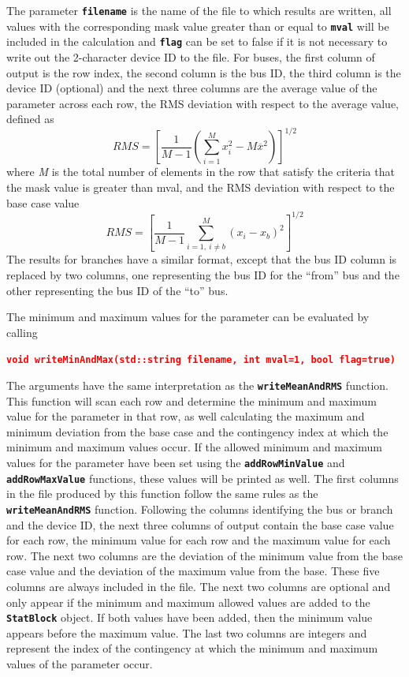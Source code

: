 \documentclass[12pt]{report} %
\begin{document}
The parameter \texttt{\textbf{filename}} is the name of the file to which results are written, all values with the corresponding mask value greater than or equal to \texttt{\textbf{mval}} will be included in the calculation and \texttt{\textbf{flag}} can be set to false if it is not necessary to write out the 2-character device ID to the file. For buses, the first column of output is the row index, the second column is the bus ID, the third column is the device ID (optional) and the next three columns are the average value of the parameter across each row, the RMS deviation with respect to the average value, defined as\[RMS={\left[\frac{1}{M-1}\left(\sum^M_{i=1}{x^2_i-M{\overline{x}}^2}\right)\right]}^{1/2}\] 
where \textit{M} is the total number of elements in the row that satisfy the criteria that the mask value is greater than mval, and the RMS deviation with respect to the base case value
\[RMS={\left[\frac{1}{M-1}\sum^M_{i=1,\ i\neq b}{{\left(x_i-x_b\right)}^2}\right]}^{1/2}\] 
The results for branches have a similar format, except that the bus ID column is replaced by two columns, one representing the bus ID for the ``from'' bus and the other representing the bus ID of the ``to'' bus.

The minimum and maximum values for the parameter can be evaluated by calling

\textcolor{red}{\texttt{\textbf{void writeMinAndMax(std::string filename, int mval=1, bool flag=true)}}}

The arguments have the same interpretation as the \texttt{\textbf{writeMeanAndRMS}} function. This function will scan each row and determine the minimum and maximum value for the parameter in that row, as well calculating the maximum and minimum deviation from the base case and the contingency index at which the minimum and maximum values occur. If the allowed minimum and maximum values for the parameter have been set using the \texttt{\textbf{addRowMinValue}} and \texttt{\textbf{addRowMaxValue}} functions, these values will be printed as well. The first columns in the file produced by this function follow the same rules as the \texttt{\textbf{writeMeanAndRMS}} function. Following the columns identifying the bus or branch and the device ID, the next three columns of output contain the base case value for each row, the minimum value for each row and the maximum value for each row.  The next two columns are the deviation of the minimum value from the base case value and the deviation of the maximum value from the base. These five columns are always included in the file. The next two columns are optional and only appear if the minimum and maximum allowed values are added to the \texttt{\textbf{StatBlock}} object. If both values have been added, then the minimum value appears before the maximum value. The last two columns are integers and represent the index of the contingency at which the minimum and maximum values of the parameter occur.
\end{document}
